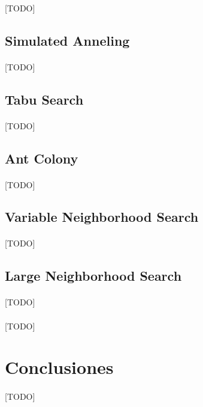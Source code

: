 \documentclass{subfiles}
\begin{document}
        \paragraph{}
        [TODO]

      \subsection{Simulated Anneling}
      \label{sec:solving_simulated_anneling}

        \paragraph{}
        [TODO]

      \subsection{Tabu Search}
      \label{sec:solving_tabu}

        \paragraph{}
        [TODO]

      \subsection{Ant Colony}
      \label{sec:solving_ant_colony}

        \paragraph{}
        [TODO]

      \subsection{Variable Neighborhood Search}
      \label{sec:solving_vns}

        \paragraph{}
        [TODO]

      \subsection{Large Neighborhood Search}
      \label{sec:solving_lns}

        \paragraph{}
        [TODO]

      \paragraph{}
      [TODO]

    \section{Conclusiones}
    \label{sec:solving_conclusions}

      \paragraph{}
      [TODO]
\end{document}
